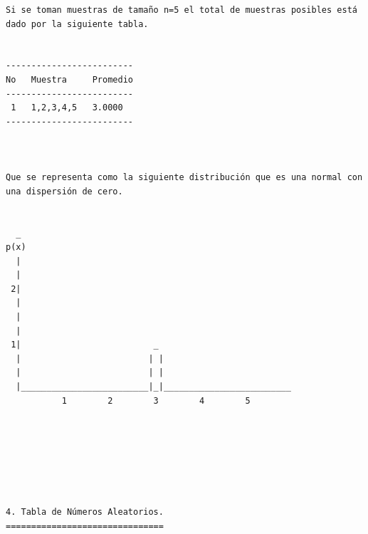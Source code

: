 \begin{verbatim}
Si se toman muestras de tamaño n=5 el total de muestras posibles está dado por la siguiente tabla.


-------------------------
No   Muestra     Promedio
-------------------------
 1   1,2,3,4,5   3.0000
-------------------------



Que se representa como la siguiente distribución que es una normal con una dispersión de cero.


  _
p(x)
  |
  |
 2|
  |
  |
  |
 1|                          _
  |                         | |
  |                         | |
  |_________________________|_|_________________________
           1        2        3        4        5






 
4. Tabla de Números Aleatorios.
===============================



\end{verbatim}

